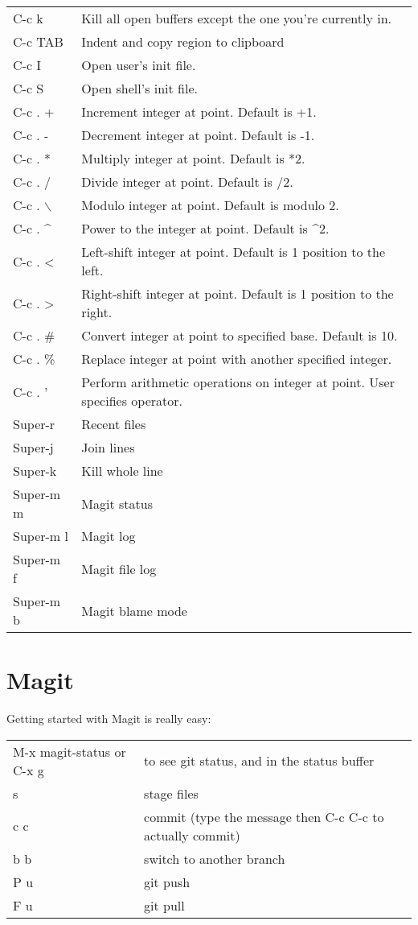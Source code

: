 \documentclass[11pt]{article}
\begin{document}
\begin{center}
\begin{tabular}{ll}
C-c k & Kill all open buffers except the one you're currently in.\\
C-c TAB & Indent and copy region to clipboard\\
C-c I & Open user's init file.\\
C-c S & Open shell's init file.\\
C-c . + & Increment integer at point. Default is +1.\\
C-c . - & Decrement integer at point. Default is -1.\\
C-c . * & Multiply integer at point. Default is *2.\\
C-c . / & Divide integer at point. Default is /2.\\
C-c . $\backslash$ & Modulo integer at point. Default is modulo 2.\\
C-c . \^{} & Power to the integer at point. Default is \^{}2.\\
C-c . < & Left-shift integer at point. Default is 1 position to the left.\\
C-c . > & Right-shift integer at point. Default is 1 position to the right.\\
C-c . \# & Convert integer at point to specified base. Default is 10.\\
C-c . \% & Replace integer at point with another specified integer.\\
C-c . ' & Perform arithmetic operations on integer at point. User specifies operator.\\
Super-r & Recent files\\
Super-j & Join lines\\
Super-k & Kill whole line\\
Super-m m & Magit status\\
Super-m l & Magit log\\
Super-m f & Magit file log\\
Super-m b & Magit blame mode\\
\end{tabular}
\end{center}

\section{Magit}
\label{sec:org300b090}
Getting started with Magit is really easy:\\
\begin{center}
\begin{tabular}{ll}
\hline
M-x magit-status or C-x g & to see git status, and in the status buffer\\
s & stage files\\
c c & commit (type the message then C-c C-c to actually commit)\\
b b & switch to another branch\\
P u & git push\\
F u & git pull\\
\end{tabular}
\end{center}
\end{document}
